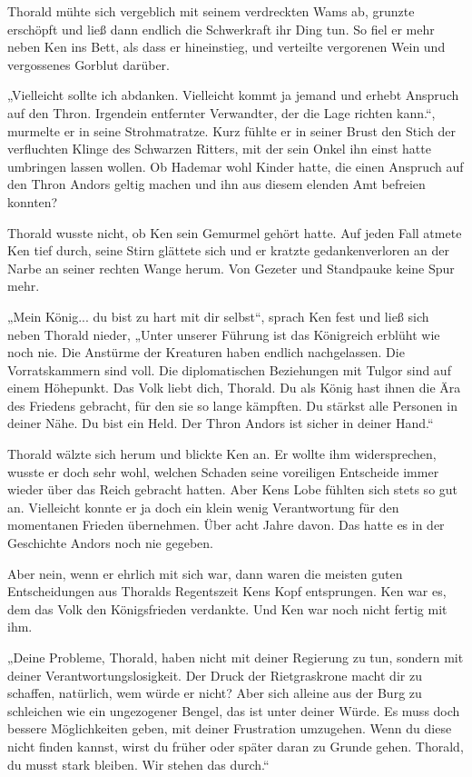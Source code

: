Thorald mühte sich vergeblich mit seinem verdreckten Wams ab, grunzte erschöpft und ließ dann endlich die Schwerkraft ihr Ding tun. So fiel er mehr neben Ken ins Bett, als dass er hineinstieg, und verteilte vergorenen Wein und vergossenes Gorblut darüber.

„Vielleicht sollte ich abdanken. Vielleicht kommt ja jemand und erhebt Anspruch auf den Thron. Irgendein entfernter Verwandter, der die Lage richten kann.“, murmelte er in seine Strohmatratze. Kurz fühlte er in seiner Brust den Stich der verfluchten Klinge des Schwarzen Ritters, mit der sein Onkel ihn einst hatte umbringen lassen wollen. Ob Hademar wohl Kinder hatte, die einen Anspruch auf den Thron Andors geltig machen und ihn aus diesem elenden Amt befreien konnten?

Thorald wusste nicht, ob Ken sein Gemurmel gehört hatte. Auf jeden Fall atmete Ken tief durch, seine Stirn glättete sich und er kratzte gedankenverloren an der Narbe an seiner rechten Wange herum. Von Gezeter und Standpauke keine Spur mehr.

„Mein König... du bist zu hart mit dir selbst“, sprach Ken fest und ließ sich neben Thorald nieder, „Unter unserer Führung ist das Königreich erblüht wie noch nie. Die Anstürme der Kreaturen haben endlich nachgelassen. Die Vorratskammern sind voll. Die diplomatischen Beziehungen mit Tulgor sind auf einem Höhepunkt. Das Volk liebt dich, Thorald. Du als König hast ihnen die Ära des Friedens gebracht, für den sie so lange kämpften. Du stärkst alle Personen in deiner Nähe. Du bist ein Held. Der Thron Andors ist sicher in deiner Hand.“

Thorald wälzte sich herum und blickte Ken an. Er wollte ihm widersprechen, wusste er doch sehr wohl, welchen Schaden seine voreiligen Entscheide immer wieder über das Reich gebracht hatten. Aber Kens Lobe fühlten sich stets so gut an. Vielleicht konnte er ja doch ein klein wenig Verantwortung für den momentanen Frieden übernehmen. Über acht Jahre davon. Das hatte es in der Geschichte Andors noch nie gegeben.

Aber nein, wenn er ehrlich mit sich war, dann waren die meisten guten Entscheidungen aus Thoralds Regentszeit Kens Kopf entsprungen. Ken war es, dem das Volk den Königsfrieden verdankte. Und Ken war noch nicht fertig mit ihm.

„Deine Probleme, Thorald, haben nicht mit deiner Regierung zu tun, sondern mit deiner Verantwortungslosigkeit. Der Druck der Rietgraskrone macht dir zu schaffen, natürlich, wem würde er nicht? Aber sich alleine aus der Burg zu schleichen wie ein ungezogener Bengel, das ist unter deiner Würde. Es muss doch bessere Möglichkeiten geben, mit deiner Frustration umzugehen. Wenn du diese nicht finden kannst, wirst du früher oder später daran zu Grunde gehen. Thorald, du musst stark bleiben. Wir stehen das durch.“

